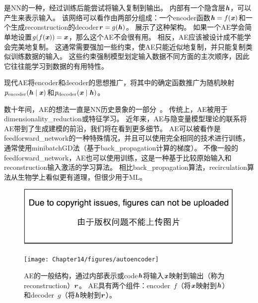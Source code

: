 \chapter{}
\label{chap:autoencoders}
是\gls{NN}的一种，经过训练后能尝试将输入复制到输出。
内部有一个隐含层$\boldsymbol{\mathit{h}}$，可以产生来表示输入。
该网络可以看作由两部分组成：一个\gls{encoder}函数$ \boldsymbol{\mathit{h}} = f(\boldsymbol{\mathit{x}})$和一个生成\gls{reconstruction}的\gls{decoder}$\boldsymbol{\mathit{r}}=g(\boldsymbol{\mathit{h}})$。
展示了这种架构。
如果一个\gls{AE}学会简单地设置$g(f(\boldsymbol{\mathit{x}})) =\boldsymbol{\mathit{x}}$，那么这个\gls{AE}不会很有用。
相反，\gls{AE}应该被设计成不能学会完美地复制。
这通常需要强加一些约束，使\gls{AE}只能近似地复制，并只能复制类似训练数据的输入。
这些约束强制模型划定输入数据不同方面的主次顺序，因此它往往能学习到数据的有用特性。


现代\gls{AE}将\gls{encoder}和\gls{decoder}的思想推广，将其中的确定函数推广为随机映射$p_{\text{encoder}} (\boldsymbol{\mathit{h}} \mid \boldsymbol{\mathit{x}})$和$p_{\text{decoder}}(\boldsymbol{\mathit{x}} \mid \boldsymbol{\mathit{h}})$。


数十年间，\gls{AE}的想法一直是\gls{NN}历史景象的一部分~\citep{Lecun-these87,Bourlard88,hinton1994amd-small}。
传统上，\gls{AE}被用于\gls{dimensionality_reduction}或特征学习。
近年来，\gls{AE}与隐变量模型理论的联系将\gls{AE}带到了生成建模的前沿，我们将在看到更多细节。
\gls{AE}可以被看作是\gls{feedforward_network}的一种特殊情况，并且可以使用完全相同的技术进行训练，通常使用\gls{minibatch}\gls{GD}法（基于\gls{back_propagation}计算的梯度）。
不像一般的\gls{feedforward_network}，\gls{AE}也可以使用训练\citep{Hinton+McClelland-NIPS1987}，这是一种基于比较原始输入和\gls{reconstruction}输入激活的学习算法。
相比\gls{back_propagation}算法，\gls{recirculation}算法从生物学上看似更有道理，但很少用于\gls{ML}。

\begin{figure}[!htb]
\ifOpenSource
\centerline{\includegraphics{figure.pdf}}
\else
\centerline{\texttt{[image: Chapter14/figures/autoencoder]}}
\fi
\caption{\gls{AE}的一般结构，通过内部表示或\gls{code}$\boldsymbol{\mathit{h}}$将输入$\boldsymbol{\mathit{x}}$映射到输出（称为\gls{reconstruction}）$\boldsymbol{\mathit{r}}$。
\gls{AE}具有两个组件：\gls{encoder}~$f$（将$\boldsymbol{\mathit{x}}$映射到$\boldsymbol{\mathit{h}}$）和\gls{decoder}~$g$（将$\boldsymbol{\mathit{h}}$映射到$\boldsymbol{\mathit{r}}$）。
}
\label{fig:chap14_autoencoder}
\end{figure}

